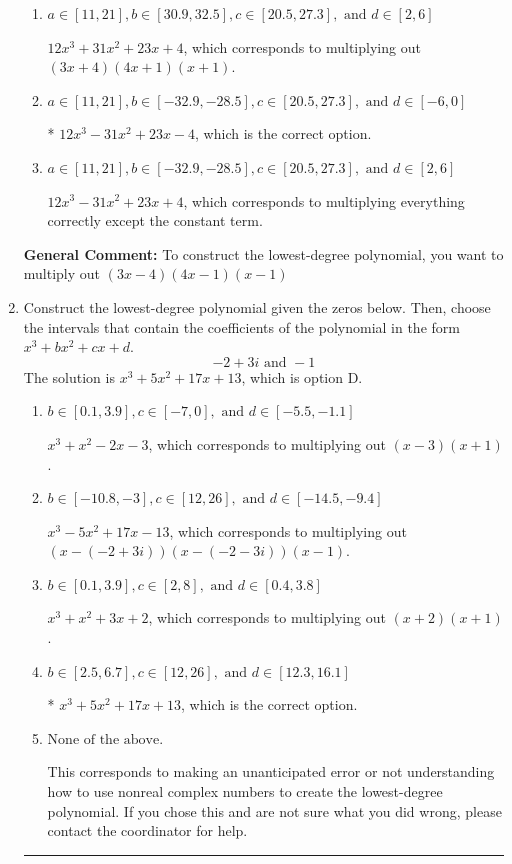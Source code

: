 \documentclass{extbook}[14pt]
\newcommand{\litem}[1]{\item #1

\rule{\textwidth}{0.4pt}}
\begin{document}
\begin{enumerate}
{\begin{enumerate}[label=\Alph*.]
$12x^{3} +7 x^{2} -15 x -4$, which corresponds to multiplying out $(3x + 4)(4x + 1)(x -1)$.
\item \( a \in [11, 21], b \in [30.9, 32.5], c \in [20.5, 27.3], \text{ and } d \in [2, 6] \)

$12x^{3} +31 x^{2} +23 x + 4$, which corresponds to multiplying out $(3x + 4)(4x + 1)(x + 1)$.
\item \( a \in [11, 21], b \in [-32.9, -28.5], c \in [20.5, 27.3], \text{ and } d \in [-6, 0] \)

* $12x^{3} -31 x^{2} +23 x -4$, which is the correct option.
\item \( a \in [11, 21], b \in [-32.9, -28.5], c \in [20.5, 27.3], \text{ and } d \in [2, 6] \)

$12x^{3} -31 x^{2} +23 x + 4$, which corresponds to multiplying everything correctly except the constant term.
\end{enumerate}

\textbf{General Comment:} To construct the lowest-degree polynomial, you want to multiply out $(3x -4)(4x -1)(x -1)$
}
\litem{
Construct the lowest-degree polynomial given the zeros below. Then, choose the intervals that contain the coefficients of the polynomial in the form $x^3+bx^2+cx+d$.
\[ -2 + 3 i \text{ and } -1 \]The solution is \( x^{3} +5 x^{2} +17 x + 13 \), which is option D.\begin{enumerate}[label=\Alph*.]
\item \( b \in [0.1, 3.9], c \in [-7, 0], \text{ and } d \in [-5.5, -1.1] \)

$x^{3} + x^{2} -2 x -3$, which corresponds to multiplying out $(x -3)(x + 1)$.
\item \( b \in [-10.8, -3], c \in [12, 26], \text{ and } d \in [-14.5, -9.4] \)

$x^{3} -5 x^{2} +17 x -13$, which corresponds to multiplying out $(x-(-2 + 3 i))(x-(-2 - 3 i))(x -1)$.
\item \( b \in [0.1, 3.9], c \in [2, 8], \text{ and } d \in [0.4, 3.8] \)

$x^{3} + x^{2} +3 x + 2$, which corresponds to multiplying out $(x + 2)(x + 1)$.
\item \( b \in [2.5, 6.7], c \in [12, 26], \text{ and } d \in [12.3, 16.1] \)

* $x^{3} +5 x^{2} +17 x + 13$, which is the correct option.
\item \( \text{None of the above.} \)

This corresponds to making an unanticipated error or not understanding how to use nonreal complex numbers to create the lowest-degree polynomial. If you chose this and are not sure what you did wrong, please contact the coordinator for help.
\end{enumerate}

}
\end{enumerate}
\end{document}
